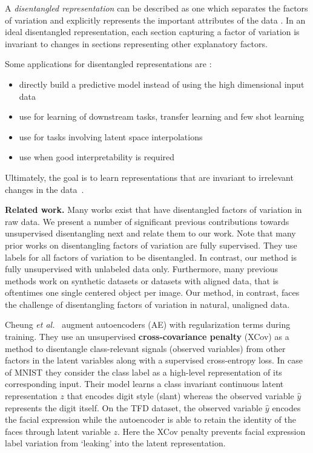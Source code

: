 \documentclass[a4paper,12pt]{report}
\begin{document}
A \textit{disentangled representation} can be described as one which separates the factors of variation and explicitly represents the important attributes of the data \cite{Framework4QuantEvalDisRepr}. In an ideal disentangled representation, each section capturing a factor of variation is invariant to changes in sections representing other explanatory factors.

Some applications for disentangled representations are \cite{ChallengeAssLofDisRepr}:
\begin{itemize}
  \item directly build a predictive model instead of using the high dimensional input data
  \item use for learning of downstream tasks, transfer learning and few shot learning
  \item use for tasks involving latent space interpolations
  \item use when good interpretability is required
\end{itemize}
Ultimately, the goal is to learn representations that are invariant to irrelevant changes in the data~\cite{FwkQuantEvalDisRep}.

\par \textbf{Related work.} Many works exist that have disentangled factors of variation in raw data. We present a number of significant previous contributions towards unsupervised disentangling next and relate them to our work. Note that many prior works on disentangling factors of variation are fully supervised. They use labels for all factors of variation to be disentangled. In contrast, our method is fully unsupervised with unlabeled data only. Furthermore, many previous methods work on synthetic datasets or datasets with aligned data, that is oftentimes one single centered object per image. Our method, in contrast, faces the challenge of disentangling factors of variation in natural, unaligned data.


\par Cheung \textit{et al.}~\cite{DiscHiddenFoViDN} augment autoencoders (AE) with regularization terms during training. They use an unsupervised \textbf{cross-covariance penalty} (XCov) as a method to disentangle class-relevant signals (observed variables) from other factors in the latent variables along with a supervised cross-entropy loss. In case of MNIST they consider the class label as a high-level representation of its corresponding input. Their model learns a class invariant continuous latent representation $z$ that encodes digit style (slant) whereas the observed variable $\hat{y}$ represents the digit itself. On the TFD dataset, the observed variable $\hat{y}$ encodes the facial expression while the autoencoder is able to retain the identity of the faces through latent variable $z$. Here the XCov penalty prevents facial expression label variation from ‘leaking’ into the latent representation.
\end{document}
